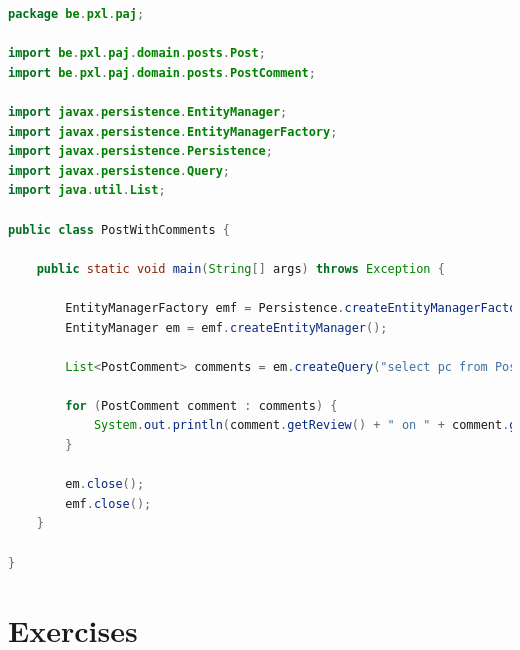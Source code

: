 \begin{lstlisting}[frame=single,  language=java]
package be.pxl.paj;

import be.pxl.paj.domain.posts.Post;
import be.pxl.paj.domain.posts.PostComment;

import javax.persistence.EntityManager;
import javax.persistence.EntityManagerFactory;
import javax.persistence.Persistence;
import javax.persistence.Query;
import java.util.List;

public class PostWithComments {

	public static void main(String[] args) throws Exception {

		EntityManagerFactory emf = Persistence.createEntityManagerFactory("musicdb_pu");
		EntityManager em = emf.createEntityManager();

		List<PostComment> comments = em.createQuery("select pc from PostComment pc join fetch pc.post p", PostComment.class).getResultList();
		
		for (PostComment comment : comments) {
			System.out.println(comment.getReview() + " on " + comment.getPost().getTitle());
		}

		em.close();
		emf.close();
	}

}
\end{lstlisting}


\section{Exercises}

